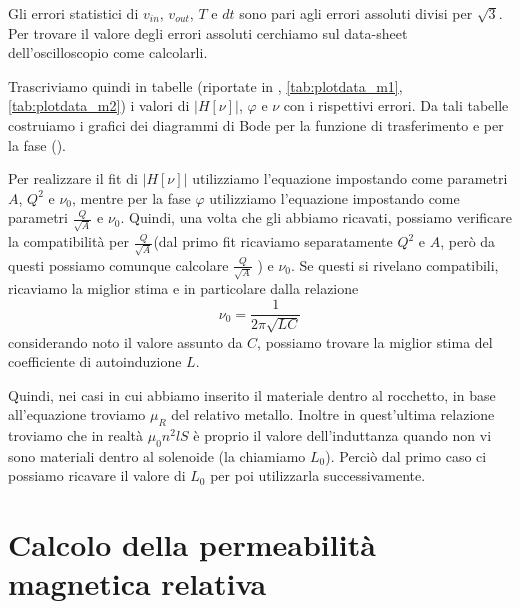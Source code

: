 \documentclass[
    rmp,
    floatfix,
    reprint, 
    superscriptaddress, 
    altaffilletter, 
    amsmath, 
    amssymb, 
    a4paper]{revtex4-2}
\begin{document}
Gli errori statistici di $v_{in}$, $v_{out}$, $T$ e $dt$ sono pari agli errori assoluti divisi per $\sqrt{3}$. Per trovare il valore degli errori assoluti cerchiamo sul data-sheet dell'oscilloscopio come calcolarli.

Trascriviamo quindi in tabelle (riportate in , \ref{tab:plotdata_m1}, \ref{tab:plotdata_m2}) i valori di $\big|H[\nu]\big|$, $\varphi$ e $\nu$ con i rispettivi errori. Da tali tabelle costruiamo i grafici dei diagrammi di Bode per la funzione di trasferimento e per la fase (). 



Per realizzare il fit di $\big|H[\nu]\big|$ utilizziamo l'equazione  impostando come parametri $A$, $Q^2$ e $\nu_{0}$, mentre per la fase $\varphi$ utilizziamo l'equazione  impostando come parametri $\frac{Q}{\sqrt{A}}$ e $\nu_0$. Quindi, una volta che gli abbiamo ricavati, possiamo verificare la compatibilità per $\frac{Q}{\sqrt{A}}$(dal primo fit ricaviamo separatamente $Q^2$ e $A$, però da questi possiamo comunque calcolare $\frac{Q}{\sqrt{A}}$ ) e $\nu_0$. Se questi si rivelano compatibili, ricaviamo la miglior stima e in particolare dalla relazione \[\nu_0=\frac{1}{2\pi\sqrt{LC}}\]  considerando noto il valore assunto da $C$, possiamo trovare la miglior stima del coefficiente di autoinduzione $L$. 

Quindi, nei casi in cui abbiamo inserito il materiale dentro al rocchetto, in base all'equazione  troviamo $\mu_R$ del relativo metallo. Inoltre in quest'ultima relazione troviamo che in realtà $\mu_0 n^2 l S$ è proprio il valore dell'induttanza quando non vi sono materiali dentro al solenoide (la chiamiamo $L_0$). Perciò dal primo caso ci possiamo ricavare il valore di $L_0$ per poi utilizzarla successivamente. 




\section*{Calcolo della permeabilità magnetica relativa}
\end{document}
